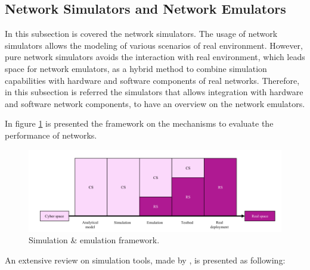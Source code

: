 \subsection{Network Simulators and Network Emulators}
\label{subs:335}

In this subsection is covered the network simulators. The usage of network simulators allows the modeling of various scenarios of real environment. However, pure network simulators avoids the interaction with real environment, which leads space for network emulators, as a hybrid method to combine simulation capabilities with hardware and software components of real networks. Therefore, in this subsection is referred the simulators that allows integration with hardware and software network components, to have an overview on the network emulators.

In figure \ref{fig:simul_VS_emul} is presented the framework on the mechanisms to evaluate the performance of networks.

\begin{figure}[h!]
	\centering
	\includegraphics[width=1\textwidth,keepaspectratio]{figures/33.WirelessN/simul_VS_emul}
	\caption{Simulation \& emulation framework.}
	\label{fig:simul_VS_emul}
\end{figure}

An extensive review on simulation tools, made by \cite{nayyar2015}, is presented as following:

